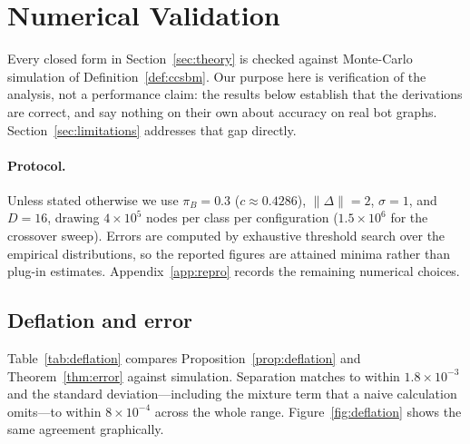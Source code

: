\documentclass[../elsevier.tex]{subfiles}
\begin{document}
\section{Numerical Validation}
\label{sec:validation}

Every closed form in Section~\ref{sec:theory} is checked against Monte-Carlo
simulation of Definition~\ref{def:ccsbm}. Our purpose here is verification of the
analysis, not a performance claim: the results below establish that the derivations
are correct, and say nothing on their own about accuracy on real bot graphs.
Section~\ref{sec:limitations} addresses that gap directly.

\paragraph{Protocol.}
Unless stated otherwise we use $\pi_B = 0.3$ ($c \approx 0.4286$),
$\|\Delta\| = 2$, $\sigma = 1$, and $D = 16$, drawing $4\times 10^5$ nodes per class
per configuration ($1.5 \times 10^6$ for the crossover sweep). Errors are computed
by exhaustive threshold search over the empirical distributions, so the reported
figures are attained minima rather than plug-in estimates.
Appendix~\ref{app:repro} records the remaining numerical choices.

\subsection{Deflation and error}

Table~\ref{tab:deflation} compares Proposition~\ref{prop:deflation} and
Theorem~\ref{thm:error} against simulation. Separation matches to within
$1.8\times 10^{-3}$ and the standard deviation---including the mixture term that a
naive calculation omits---to within $8\times 10^{-4}$ across the whole range.
Figure~\ref{fig:deflation} shows the same agreement graphically.
\end{document}

